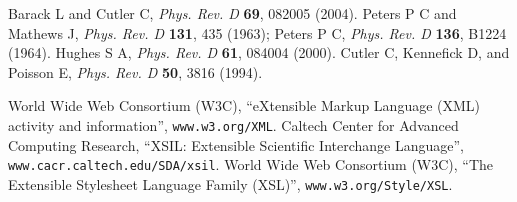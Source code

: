 \documentclass[12pt]{iopart}
\begin{document}
\begin{thebibliography}{10}
 Barack L and Cutler C, \emph{Phys. Rev. D} {\bf 69}, 082005 (2004).
 Peters P C and Mathews J, \emph{Phys. Rev. D} {\bf 131}, 435 (1963);
 Peters P C, \emph{Phys. Rev. D} {\bf 136}, B1224 (1964).
 Hughes S A, \emph{Phys. Rev. D} {\bf 61}, 084004 (2000).
 Cutler C, Kennefick D, and Poisson E, \emph{Phys. Rev. D} {\bf 50}, 3816 (1994).

 World Wide Web Consortium (W3C), ``eXtensible Markup Language (XML) activity and information'', \texttt{www.w3.org/XML}.
 Caltech Center for Advanced Computing Research, ``XSIL: Extensible Scientific Interchange Language'', \texttt{www.cacr.caltech.edu/SDA/xsil}.
 World Wide Web Consortium (W3C), ``The Extensible Stylesheet Language Family (XSL)'', \texttt{www.w3.org/Style/XSL}.

\end{thebibliography}
\end{document}
